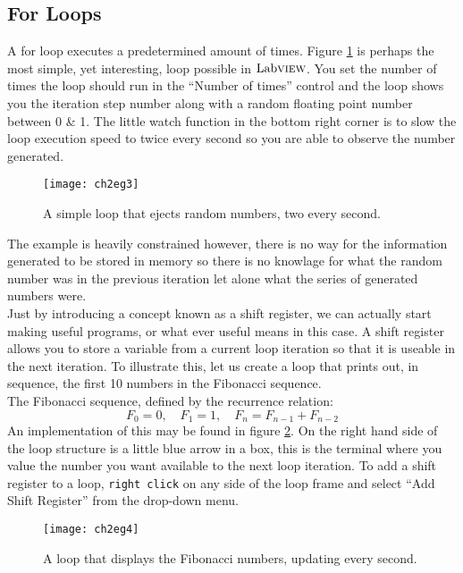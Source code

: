 \subsection{For Loops}
A for loop executes a predetermined amount of times. Figure \ref{ch2eg3} is perhaps the most simple, yet interesting, loop possible in $\text{Lab}\textsc{view}$. You set the number of times the loop should run in the ``Number of times'' control and the loop shows you the iteration step number along with a random floating point number between 0 \& 1. The little watch function in the bottom right corner is to slow the loop execution speed to twice every second so you are able to observe the number generated.\\
\begin{figure}
	\centering
	\texttt{[image: ch2eg3]}
	\caption{A simple loop that ejects random numbers, two every second.}
	\label{ch2eg3}
\end{figure}

The example is heavily constrained however, there is no way for the information generated to be stored in memory so there is no knowlage for what the random number was in the previous iteration let alone what the series of generated numbers were.\\

Just by introducing a concept known as a shift register, we can actually start making useful programs, or what ever useful means in this case. A shift register allows you to store a variable from a current loop iteration so that it is useable in the next iteration. To illustrate this, let us create a loop that prints out, in sequence, the first 10 numbers in the Fibonacci sequence.\\

The Fibonacci sequence, defined by the recurrence relation:
\begin{equation*}
	F_0=0,\quad F_1=1,\quad F_n= F_{n-1} + F_{n-2}
\end{equation*}
An implementation of this may be found in figure \ref{ch2eg4}. On the right hand side of the loop structure is a little blue arrow in a box, this is the terminal where you value the number you want available to the next loop iteration. To add a shift register to a loop, \texttt{right click} on any side of the loop frame and select ``Add Shift Register'' from the drop-down menu.\\
\begin{figure}
	\centering
	\texttt{[image: ch2eg4]}
	\caption{A loop that displays the Fibonacci numbers, updating every second.}
	\label{ch2eg4}
\end{figure}

